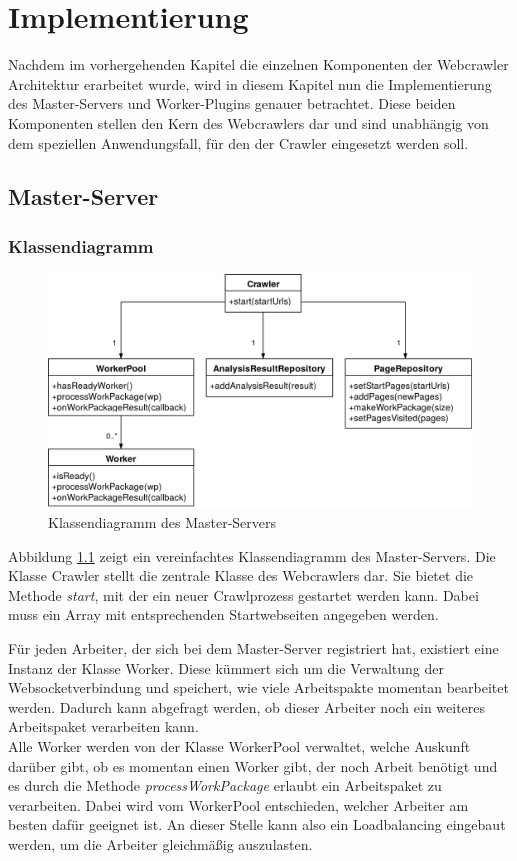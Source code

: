 \chapter{Implementierung}
Nachdem im vorhergehenden Kapitel die einzelnen Komponenten der Webcrawler Architektur erarbeitet wurde, wird in diesem Kapitel nun die Implementierung des Master-Servers und Worker-Plugins genauer betrachtet. Diese beiden Komponenten stellen den Kern des Webcrawlers dar und sind unabhängig von dem speziellen Anwendungsfall, für den der Crawler eingesetzt werden soll.
\section{Master-Server}
\subsection{Klassendiagramm}

\begin{figure}
	\centering
	\hspace*{-0.5cm}
	\includegraphics[width=1.1\textwidth]{Bilder/CrawlerKlassendiagramm.png}
	\caption{Klassendiagramm des Master-Servers}
	\label{Klassendiagramm}
\end{figure}

Abbildung \ref{Klassendiagramm} zeigt ein vereinfachtes Klassendiagramm des Master-Servers. Die Klasse Crawler stellt die zentrale Klasse des Webcrawlers dar. Sie bietet die Methode \textit{start}, mit der ein neuer Crawlprozess gestartet werden kann. Dabei muss ein Array mit entsprechenden Startwebseiten angegeben werden. 

Für jeden Arbeiter, der sich bei dem Master-Server registriert hat, existiert eine Instanz der Klasse Worker. Diese kümmert sich um die Verwaltung der Websocketverbindung und speichert, wie viele Arbeitspakte momentan bearbeitet werden. Dadurch kann abgefragt werden, ob dieser Arbeiter noch ein weiteres Arbeitspaket verarbeiten kann. \\
Alle Worker werden von der Klasse WorkerPool verwaltet, welche Auskunft darüber gibt, ob es momentan einen Worker gibt, der noch Arbeit benötigt und es durch die Methode \textit{processWorkPackage} erlaubt ein Arbeitspaket zu verarbeiten. Dabei wird vom WorkerPool entschieden, welcher Arbeiter am besten dafür geeignet ist. An dieser Stelle kann also ein Loadbalancing eingebaut werden, um die Arbeiter gleichmäßig auszulasten.

